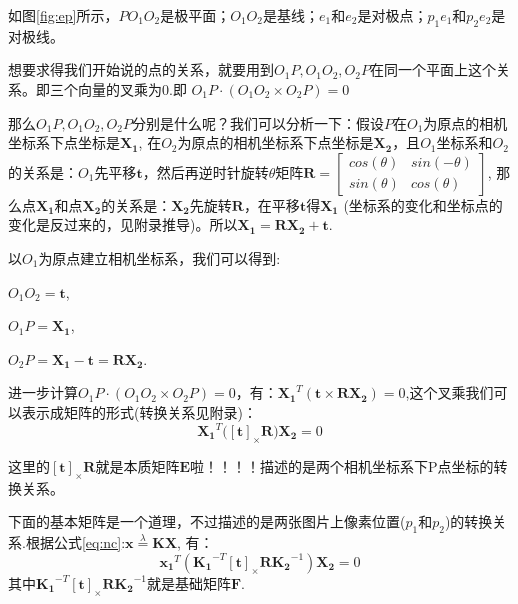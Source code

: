 \documentclass[12pt]{article}
\begin{document}
如图\ref{fig:ep}所示，$PO_1O_2$是极平面；$O_1O_2$是基线；$e_1$和$e_2$是对极点；$p_1e_1$和$p_2e_2$是对极线。

想要求得我们开始说的点的关系，就要用到$O_1P,O_1O_2,O_2P$在同一个平面上这个关系。即三个向量的叉乘为0.即
$O_1P\cdot (O_1O_2\times O_2P)=0$

那么$O_1P,O_1O_2,O_2P$分别是什么呢？我们可以分析一下：假设$P$在$O_1$为原点的相机坐标系下点坐标是$\mathbf{X_1}$,
在$O_2$为原点的相机坐标系下点坐标是$\mathbf{X_2}$，且$O_1$坐标系和$O_2$的关系是：$O_1$先平移$\mathbf{t}$，然后再逆时针旋转$\theta$矩阵$\mathbf{R}=\left[
    \begin{array}{ll}
        cos(\theta) & sin(-\theta)\\
        sin(\theta) & cos(\theta)
    \end{array}
\right]$,
那么点$\mathbf{X_1}$和点$\mathbf{X_2}$的关系是：$\mathbf{X_2}$先旋转$\mathbf{R}$，在平移$\mathbf{t}$得$\mathbf{X_1}$
(坐标系的变化和坐标点的变化是反过来的，见附录推导)。所以$\mathbf{X_1}=\mathbf{RX_2}+\mathbf{t}$.

以$O_1$为原点建立相机坐标系，我们可以得到:

$O_1O_2=\mathbf{t}$,

$O_1P=\mathbf{X_1}$,

$O_2P=\mathbf{X_1-t=RX_2}$.

进一步计算$O_1P\cdot (O_1O_2\times O_2P)=0$，有：$\mathbf{X_1}^T(\mathbf{t\times RX_2})=0$,这个叉乘我们可以表示成矩阵的形式(转换关系见附录)：
\begin{equation}
    \mathbf{X_1}^T(\mathbf{[t]}_\times\mathbf{R)X_2}=0
\end{equation}

这里的$\mathbf{[t]}_\times\mathbf{R}$就是本质矩阵$\mathbf{E}$啦！！！！描述的是两个相机坐标系下P点坐标的转换关系。

下面的基本矩阵是一个道理，不过描述的是两张图片上像素位置($p_1$和$p_2$)的转换关系.根据公式\ref{eq:nc}:$\mathbf{x}\overset{\lambda}{=}\mathbf{KX}$,
有：
\begin{equation}
    \mathbf{x_1}^T(\mathbf{K_1}^{-T}[\mathbf{t}]_\times \mathbf{RK_2}^{-1})\mathbf{X_2}=0
\end{equation}
其中$\mathbf{K_1}^{-T}[\mathbf{t}]_\times \mathbf{RK_2}^{-1}$就是基础矩阵$\mathbf{F}$.
\end{document}
